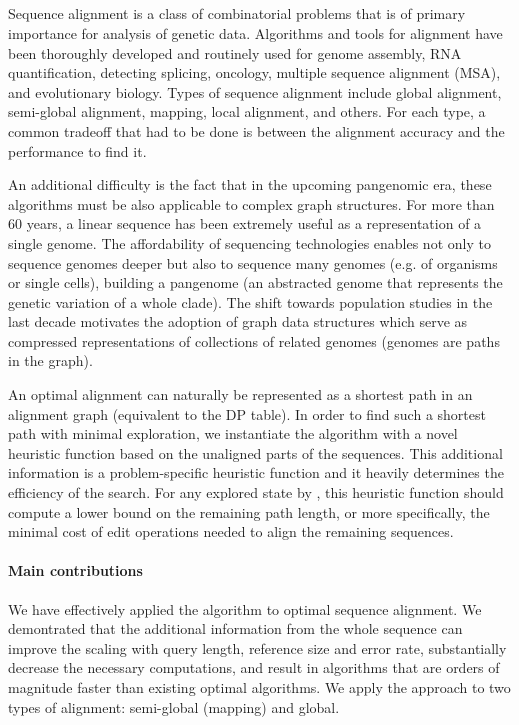 \subsection{}


Sequence alignment is a class of combinatorial problems that is of primary
importance for analysis of genetic data. Algorithms and tools for alignment have
been thoroughly developed and routinely used for genome assembly, RNA
quantification, detecting splicing, oncology, multiple sequence alignment (MSA),
and evolutionary biology. Types of sequence alignment include global alignment,
semi-global alignment, mapping, local alignment, and others. For each type, a
common tradeoff that had to be done is between the alignment accuracy and the
performance to find it.

An additional difficulty is the fact that in the
upcoming pangenomic era, these algorithms must be also applicable to complex
graph structures. For more than 60 years, a linear sequence has been extremely
useful as a representation of a single genome. The affordability of sequencing
technologies enables not only to sequence genomes deeper but also to sequence
many genomes (e.g. of organisms or single cells), building a pangenome (an
abstracted genome that represents the genetic variation of a whole clade). The
shift towards population studies in the last decade motivates the adoption of
graph data structures which serve as compressed representations of collections
of related genomes (genomes are paths in the graph).

An optimal alignment can naturally be represented as a shortest path in an
alignment graph (equivalent to the DP table). In order to find such a shortest
path with minimal exploration, we instantiate the \A algorithm with a novel
heuristic function based on the unaligned parts of the sequences. This
additional information is a problem-specific heuristic function and it heavily
determines the efficiency of the search. For any explored state by \A, this
heuristic function should compute a lower bound on the remaining path length, or
more specifically, the minimal cost of edit operations needed to align the
remaining sequences.

\paragraph{Main contributions}
We have effectively applied the \A algorithm to optimal sequence alignment. We
demontrated that the additional information from the whole sequence can improve
the scaling with query length, reference size and error rate, substantially
decrease the necessary computations, and result in algorithms that are orders of
magnitude faster than existing optimal algorithms. We apply the \A approach to
two types of alignment: semi-global (mapping) and global.






